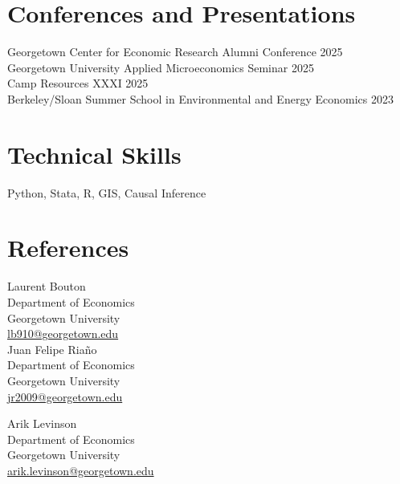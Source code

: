 \documentclass[11pt]{article}
\begin{document}

\section*{Conferences and Presentations}
Georgetown Center for Economic Research Alumni Conference \hfill 2025 \\
Georgetown University Applied Microeconomics Seminar \hfill 2025 \\
Camp Resources XXXI \hfill 2025 \\
Berkeley/Sloan Summer School in Environmental and Energy Economics \hfill 2023

\section*{Technical Skills}
Python, Stata, R, GIS, Causal Inference

\section*{References}

\begin{minipage}[t]{0.48\textwidth}
Laurent Bouton \\
Department of Economics \\
Georgetown University \\
\href{mailto:lb910@georgetown.edu}{lb910@georgetown.edu} \\[1em]

Juan Felipe Ria\~no \\
Department of Economics \\
Georgetown University \\
\href{mailto:jr2009@georgetown.edu}{jr2009@georgetown.edu} \\
\end{minipage}
\hfill
\begin{minipage}[t]{0.48\textwidth}
Arik Levinson \\
Department of Economics \\
Georgetown University \\
\href{mailto:arik.levinson@georgetown.edu}{arik.levinson@georgetown.edu} \\
\end{minipage}
\end{document}
